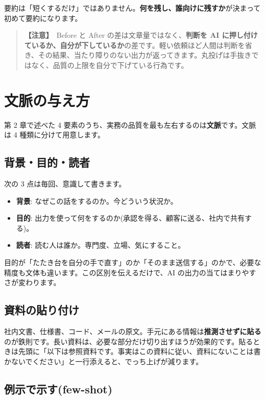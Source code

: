 \documentclass{article}
\begin{document}
要約は「短くするだけ」ではありません。\textbf{何を残し、誰向けに残すか}が決まって初めて要約になります。

\begin{quote}
\textbf{【注意】}\ Before と After の差は文章量ではなく、\textbf{判断を AI に押し付けているか、自分が下しているか}の差です。軽い依頼ほど人間は判断を省き、その結果、当たり障りのない出力が返ってきます。丸投げは手抜きではなく、品質の上限を自分で下げている行為です。
\end{quote}

\section{文脈の与え方}

第 2 章で述べた 4 要素のうち、実務の品質を最も左右するのは\textbf{文脈}です。文脈は 4 種類に分けて用意します。

\subsection{背景・目的・読者}

次の 3 点は毎回、意識して書きます。

\begin{itemize}
\item \textbf{背景}: なぜこの話をするのか。今どういう状況か。
\item \textbf{目的}: 出力を使って何をするのか(承認を得る、顧客に送る、社内で共有する)。
\item \textbf{読者}: 読む人は誰か。専門度、立場、気にすること。
\end{itemize}

目的が「たたき台を自分の手で直す」のか「そのまま送信する」のかで、必要な精度も文体も違います。この区別を伝えるだけで、AI の出力の当てはまりやすさが変わります。

\subsection{資料の貼り付け}

社内文書、仕様書、コード、メールの原文。手元にある情報は\textbf{推測させずに貼る}のが鉄則です。長い資料は、必要な部分だけ切り出すほうが効果的です。貼るときは先頭に「以下は参照資料です。事実はこの資料に従い、資料にないことは書かないでください」と一行添えると、でっち上げが減ります。

\subsection{例示で示す(few-shot)}
\end{document}
